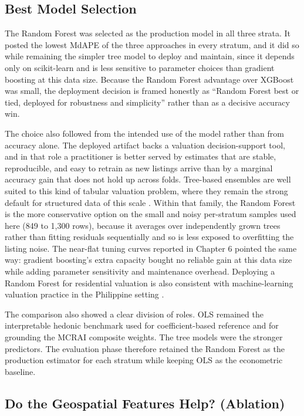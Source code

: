 \subsection{Best Model Selection}\label{best-model-selection}

The Random Forest was selected as the production model in all three strata. It posted the lowest MdAPE of the three approaches in every stratum, and it did so while remaining the simpler tree model to deploy and maintain, since it depends only on scikit-learn and is less sensitive to parameter choices than gradient boosting at this data size. Because the Random Forest advantage over XGBoost was small, the deployment decision is framed honestly as ``Random Forest best or tied, deployed for robustness and simplicity'' rather than as a decisive accuracy win.

The choice also followed from the intended use of the model rather than from accuracy alone. The deployed artifact backs a valuation decision-support tool, and in that role a practitioner is better served by estimates that are stable, reproducible, and easy to retrain as new listings arrive than by a marginal accuracy gain that does not hold up across folds. Tree-based ensembles are well suited to this kind of tabular valuation problem, where they remain the strong default for structured data of this scale \parencite{grinsztajn2022}. Within that family, the Random Forest is the more conservative option on the small and noisy per-stratum samples used here (849 to 1{,}300 rows), because it averages over independently grown trees rather than fitting residuals sequentially and so is less exposed to overfitting the listing noise. The near-flat tuning curves reported in Chapter 6 pointed the same way: gradient boosting's extra capacity bought no reliable gain at this data size while adding parameter sensitivity and maintenance overhead. Deploying a Random Forest for residential valuation is also consistent with machine-learning valuation practice in the Philippine setting \parencite{ramolete2023,viray2023}.

The comparison also showed a clear division of roles. OLS remained the interpretable hedonic benchmark used for coefficient-based reference and for grounding the MCRAI composite weights. The tree models were the stronger predictors. The evaluation phase therefore retained the Random Forest as the production estimator for each stratum while keeping OLS as the econometric baseline.


\subsection{Do the Geospatial Features Help? (Ablation)}\label{ablation}

